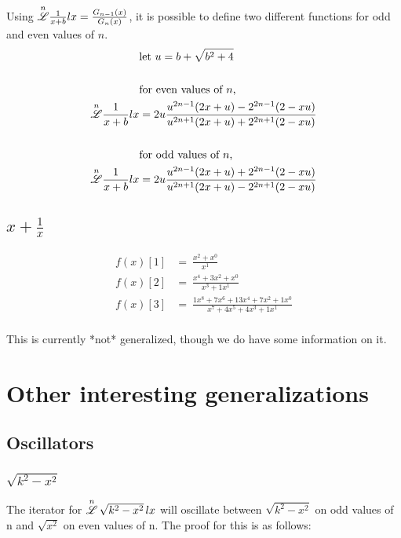 \documentclass[12pt, letterpaper]{article}
\begin{document}
Using $\overset{n}{\mathscr{L}} \frac{1}{x+b} lx = \frac{G_{n-1}(x)}{G_n(x)}$, it is possible to define two different functions for odd and even values of $n$.
\begin{equation}
    \begin{split}
        &\text{let } u = b+\sqrt{b^2+4}\\
        \\
        &\text{for even values of }n\text{,}\\
        \overset{n}{\mathscr{L}}\frac{1}{x+b}lx & = 2u\frac{u^{2n-1}(2x+u)-2^{2n-1}(2-xu)}{u^{2n+1}(2x+u)+2^{2n+1}(2-xu)}\\
        \\
        &\text{for odd values of }n\text{,}\\
        \overset{n}{\mathscr{L}}\frac{1}{x+b}lx & = 2u\frac{u^{2n-1}(2x+u)+2^{2n-1}(2-xu)}{u^{2n+1}(2x+u)-2^{2n+1}(2-xu)}\\
    \end{split}
\end{equation}

\subsection{$x + \frac{1}{x}$}
\begin{equation}
    \begin{split}
        f(x)[1] & = \  \frac{x^2+x^{0}}{x^{1}}\\
        f(x)[2] & = \  \frac{x^{4} + 3 x^{2} + x^{0}}{x^{3} + 1x^{1}}\\
        f(x)[3] & = \  \frac{1x^{8}+7x^{6}+13x^{4}+7x^{2}+1x^{0}}{x^{7}+4x^{5}+4x^{3}+ 1x^{1}}\\
    \end{split}
\end{equation}

This is currently *not* generalized, though we do have some information on it.

\section{Other interesting generalizations}

\subsection{Oscillators}
\subsubsection{$\sqrt{k^2-x^2}$}
The iterator for $\overset{n}{\mathscr{L}} \, \sqrt{k^2-x^2} \, lx$ will oscillate between $\sqrt{k^2-x^2}$ on odd values of n and $\sqrt{x^2}$ on even values of n. The proof for this is as follows:
\end{document}
